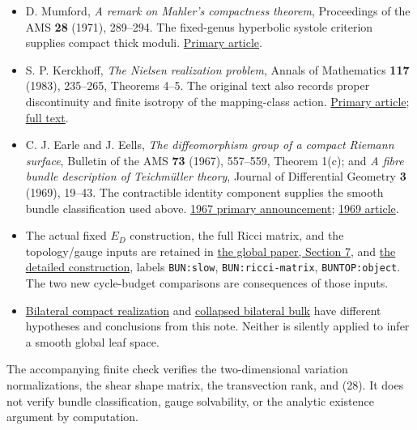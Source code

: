 \documentclass[
  11pt,
]{article}
\providecommand{\tightlist}{%
  \setlength{\itemsep}{0pt}\setlength{\parskip}{0pt}}
\begin{document}
\begin{itemize}
\tightlist
\item
  D. Mumford, \emph{A remark on Mahler's compactness theorem},
  Proceedings of the AMS \textbf{28} (1971), 289--294. The fixed-genus
  hyperbolic systole criterion supplies compact thick moduli.
  \href{https://doi.org/10.2307/2037802}{Primary article}.
\item
  S. P. Kerckhoff, \emph{The Nielsen realization problem}, Annals of
  Mathematics \textbf{117} (1983), 235--265, Theorems 4--5. The original
  text also records proper discontinuity and finite isotropy of the
  mapping-class action.
  \href{https://annals.math.princeton.edu/1983/117-2/p02}{Primary
  article};
  \href{https://poisson.phc.dm.unipi.it/~camponovo/Kerckhoff-NielsenRealizationProblem-1983.pdf}{full
  text}.
\item
  C. J. Earle and J. Eells, \emph{The diffeomorphism group of a compact
  Riemann surface}, Bulletin of the AMS \textbf{73} (1967), 557--559,
  Theorem 1(c); and \emph{A fibre bundle description of Teichmüller
  theory}, Journal of Differential Geometry \textbf{3} (1969), 19--43.
  The contractible identity component supplies the smooth bundle
  classification used above.
  \href{https://doi.org/10.1090/S0002-9904-1967-11746-4}{1967 primary
  announcement}; \href{https://doi.org/10.4310/jdg/1214428816}{1969
  article}.
\item
  The actual fixed \(E_D\) construction, the full Ricci matrix, and the
  topology/gauge inputs are retained in
  \href{../mathematics/current/skill/research/20260916_global.tex}{the
  global paper, Section 7}, and
  \href{../mathematics/current/skill/research/20260912.tex}{the detailed
  construction}, labels \texttt{BUN:slow}, \texttt{BUN:ricci-matrix},
  \texttt{BUNTOP:object}. The two new cycle-budget comparisons are
  consequences of those inputs.
\item
  \href{20260924_bilateral_realization.md}{Bilateral compact
  realization} and \href{20260924_collapsed_bilateral_bulk.md}{collapsed
  bilateral bulk} have different hypotheses and conclusions from this
  note. Neither is silently applied to infer a smooth global leaf space.
\end{itemize}

The accompanying finite check verifies the two-dimensional variation
normalizations, the shear shape matrix, the transvection rank, and (28).
It does not verify bundle classification, gauge solvability, or the
analytic existence argument by computation.
\end{document}
